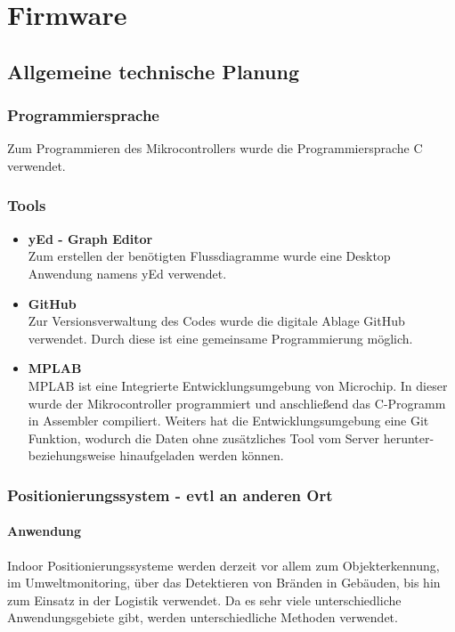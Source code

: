 \chapter{Firmware}
\renewcommand{\kapitelautor}{Autor: Christina Bornberg, Lucas Ullrich}

\section{Allgemeine technische Planung}

  \subsection{Programmiersprache}
  Zum Programmieren des Mikrocontrollers wurde die Programmiersprache C verwendet.

  \subsection{Tools}

    \begin{itemize}
      \item \textbf{yEd - Graph Editor}\\
      Zum erstellen der benötigten Flussdiagramme wurde eine Desktop Anwendung namens yEd verwendet.
      \item \textbf{GitHub}\\
      Zur Versionsverwaltung des Codes wurde die digitale Ablage GitHub verwendet. Durch diese ist eine gemeinsame Programmierung möglich.
      \item \textbf{MPLAB}\\
      MPLAB ist eine Integrierte Entwicklungsumgebung von Microchip. In dieser wurde der Mikrocontroller programmiert und anschließend das C-Programm in Assembler compiliert.
      Weiters hat die Entwicklungsumgebung eine Git Funktion, wodurch die Daten ohne zusätzliches Tool vom Server herunter- beziehungsweise hinaufgeladen werden können.
    \end{itemize}


  \subsection{Positionierungssystem - evtl an anderen Ort}

    \subsubsection{Anwendung}
    Indoor Positionierungssysteme werden derzeit vor allem zum Objekterkennung, im Umweltmonitoring, über das Detektieren von Bränden in Gebäuden,
    bis hin zum Einsatz in der Logistik verwendet. Da es sehr viele unterschiedliche Anwendungsgebiete gibt, werden unterschiedliche Methoden verwendet.

